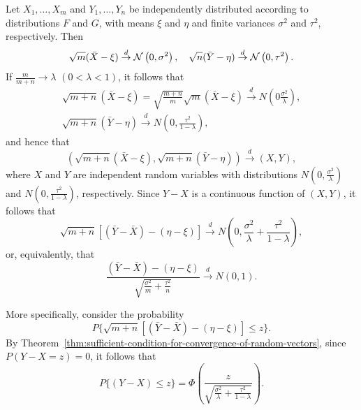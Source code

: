 \begin{example}[Multinomial]

\end{example}

\begin{example}
	Let $X_{1},\ldots,X_m$ and $Y_{1},\ldots,Y_n$ be independently distributed according to distributions $F$ and $G$, with means $\xi$ and $\eta$ and finite variances $\sigma^2$ and $\tau^2$, respectively. Then
	\begin{equation*}
		\sqrt{m}(\bar{X}-\xi)\stackrel{d}{\rightarrow}{\mathcal N}\left(0,\sigma^2\right),\quad\sqrt{n}(\bar{Y}-\eta)\stackrel{d}{\rightarrow}{\mathcal N}\left(0,\tau^2\right).
	\end{equation*}
	If $\frac{m}{m+n} \rightarrow \lambda$ $(0<\lambda<1)$, it follows that
	\begin{gather*}
		\sqrt{m+n}(\bar{X}-\xi)=\sqrt{\frac{m+n}{m}}\sqrt{m}(\bar{X}-\xi)\stackrel{d}{\rightarrow}N\left(0\frac{\sigma^2}{\lambda}\right),\\
		\sqrt{m+n}(\bar{Y}-\eta)\stackrel{d}{\rightarrow}N\left(0,\frac{\tau^2}{1-\lambda}\right),
	\end{gather*}
	and hence that
	\begin{equation*}
		(\sqrt{m+n}(\bar{X}-\xi),\sqrt{m+n}(\bar{Y}-\eta)) \stackrel{d}{\rightarrow}(X,Y),
	\end{equation*}
	where $X$ and $Y$ are independent random variables with distributions $N\left(0, \frac{\sigma^2}{\lambda}\right)$ and $N\left(0, \frac{\tau^2}{1-\lambda}\right)$, respectively.
	Since $Y-X$ is a continuous function of $(X, Y)$, it follows that
	\begin{equation*}
		\sqrt{m+n}[(\bar{Y}-\bar{X})-(\eta-\xi)]\stackrel{d}{\rightarrow}N\left(0,\frac{\sigma^2}{\lambda}+\frac{\tau^2}{1-\lambda}\right),
	\end{equation*}
	or, equivalently, that
	\begin{equation*}
		\frac{(\bar{Y}-\bar{X})-(\eta-\xi)}{\sqrt{\frac{\sigma^2}{m}+\frac{\tau^2}{n}}}\stackrel{d}{\rightarrow}N(0,1).
	\end{equation*}

	More specifically, consider the probability
	\begin{equation*}
		P\{\sqrt{m+n}[(\bar{Y}-\bar{X})-(\eta-\xi)]\leq z\}.
	\end{equation*}
	By Theorem~\ref{thm:sufficient-condition-for-convergence-of-random-vectors}, since $P(Y-X=z)=0$, it follows that
	\begin{equation*}
		P\{(Y-X) \leq z\}=\Phi\left(\frac{z}{\sqrt{\frac{\sigma^2}{\lambda}+\frac{\tau^2}{1-\lambda}}}\right).
	\end{equation*}
\end{example}


